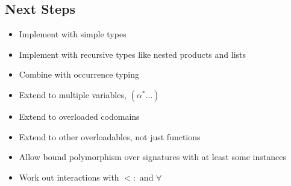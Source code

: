 \documentclass{article}
\begin{document}
\subsection*{Next Steps}
\begin{itemize}
\item Implement with simple types
\item Implement with recursive types like nested products and lists
\item Combine with occurrence typing
\item Extend to multiple variables, $(\alpha^* \ldots)$
\item Extend to overloaded codomains
\item Extend to other overloadables, not just functions
\item Allow bound polymorphism over signatures with at least some instances
\item Work out interactions with $<:$ and $\forall$
\end{itemize}
\end{document}
